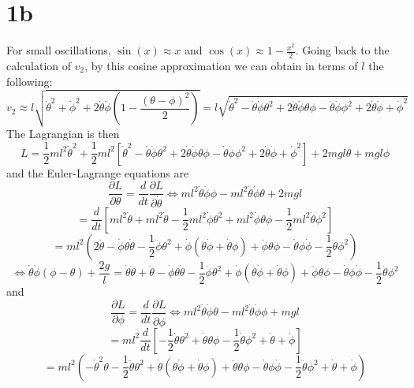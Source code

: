 \documentclass{article}
\begin{document}
\section*{1b}
For small oscillations, $\sin(x)\approx x$ and $\cos(x)\approx 1-\frac{x^2}{2}$. Going back to the calculation of $v_2$, by this cosine approximation we can obtain in terms of $l$ the following:
\[v_2\approx l\sqrt{\dot{\theta}^2+\dot{\phi}^2+2\dot{\theta}\dot{\phi}(1-\frac{(\theta-\phi)^2}{2})}=l\sqrt{\dot{\theta}^2-\dot{\theta}\dot{\phi}\theta^2+2\dot{\theta}\dot{\phi}\theta\phi-\dot{\theta}\dot{\phi}\phi^2+2\dot{\theta}\dot{\phi}+\dot{\phi}^2}\]
The Lagrangian is then
\[L=\frac{1}{2}ml^2\dot{\theta}^2+\frac{1}{2}ml^2[\dot{\theta}^2-\dot{\theta}\dot{\phi}\theta^2+2\dot{\theta}\dot{\phi}\theta\phi-\dot{\theta}\dot{\phi}\phi^2+2\dot{\theta}\dot{\phi}+\dot{\phi}^2]+2mgl\theta+mgl\phi\]
and the Euler-Lagrange equations are
\[\frac{\partial L}{\partial \theta}=\frac{d}{dt}\frac{\partial L}{\partial \dot{\theta}}\Leftrightarrow ml^2\dot{\theta}\dot{\phi}\phi-ml^2\dot{\theta}\dot{\phi}\theta+2mgl\]\[=\frac{d}{dt}\left[ ml^2\dot{\theta}+ml^2\dot{\theta}-\frac{1}{2}ml^2\dot{\phi}\theta^2 +ml^2\dot{\phi}\theta\phi-\frac{1}{2}ml^2\dot{\theta}\phi^2\right]\]
\[=ml^2\left(2\ddot{\theta}-\dot{\phi}\theta\dot{\theta}-\frac{1}{2}\ddot{\phi}\theta^2+\dot{\phi}(\theta\dot{\phi}+\dot{\theta}\phi)+\ddot{\phi}\theta\phi-\dot{\theta}\phi\dot{\phi}-\frac{1}{2}\ddot{\theta}\phi^2\right)\]
\[\Leftrightarrow \dot{\theta}\dot{\phi}(\phi-\theta)+\frac{2g}{l}=\dot{\theta}\ddot{\theta}+\ddot{\theta}-\dot{\phi}\theta\dot{\theta}-\frac{1}{2}\ddot{\phi}\theta^2+\dot{\phi}(\theta\dot{\phi}+\dot{\theta}\phi)+\ddot{\phi}\theta\phi-\dot{\theta}\phi\dot{\phi}-\frac{1}{2}\ddot{\theta}\phi^2\]
and
\[\frac{\partial L}{\partial \phi}=\frac{d}{dt}\frac{\partial L}{\partial \dot{\phi}}\Leftrightarrow ml^2\dot{\theta}\dot{\phi}\theta-ml^2\dot{\theta}\dot{\phi}\phi+mgl\]
\[=ml^2\frac{d}{dt}\left[  -\frac{1}{2}\dot{\theta}\theta^2+\dot{\theta}\theta\phi-\frac{1}{2}\dot{\theta}\phi^2+\dot{\theta}+\dot{\phi}\right]\]
\[=ml^2\left( -\dot{\theta}^2\theta-\frac{1}{2}\ddot{\theta}\theta^2+\dot{\theta}(\theta\dot{\phi}+\dot{\theta}\phi)+\ddot{\theta}\theta\phi - \dot{\theta}\phi\dot{\phi}-\frac{1}{2}\ddot{\theta}\phi^2+\dot{\theta}+\dot{\phi} \right)\]
\end{document}
